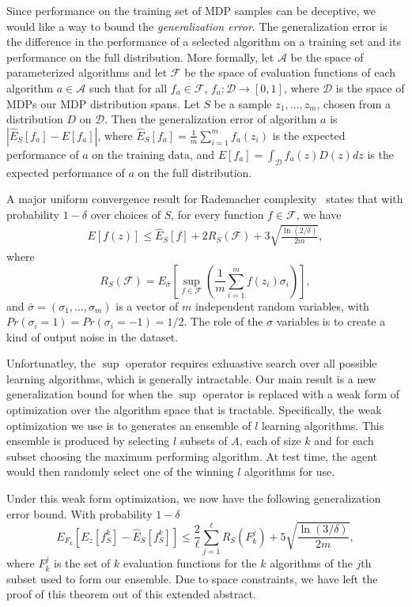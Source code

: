 Since performance on the training set of MDP samples can be deceptive, we would like a way to bound the {\em generalization error}. The generalization error is the difference in the performance of a selected algorithm on a training set and its performance on the full distribution. More formally, let $\mathcal{A}$ be the space of parameterized algorithms and let $\mathcal{F}$ be the space of evaluation functions of each algorithm $a \in \mathcal{A}$ such that for all $f_a \in \mathcal{F}$, $f_a : \mathcal{D} \rightarrow [0,1]$, where $\mathcal{D}$ is the space of MDPs our MDP distribution spans. Let $S$ be a sample $z_1,\dots, z_m$, chosen from a distribution $D$ on $\mathcal{D}$. Then the generalization error of algorithm $a$ is $| \hat{E}_S[f_a] - E[f_a] |$, where $\hat{E}_S[f_a]= \frac{1}{m}\sum_{i=1}^m f_a(z_i)$ is the expected performance of $a$ on the training data, and $E[f_a]= \int_\mathcal{D} f_a(z) D(z) dz$ is the expected performance of $a$ on the full distribution.

A major uniform convergence result for Rademacher complexity~\cite{mohri2012foundations} states that with probability $1-\delta$ over choices of $S$,
for every function $f\in \mathcal{F}$, we have
\begin{eqnarray}
E[f(z)] \le \hat{E}_S[f] + 2 R_S(\mathcal{F}) + 3\sqrt{\frac{\ln(2/\delta)}{2m}},
\end{eqnarray}
where
$$R_S (\mathcal{F}) = E_{\bar{\sigma}} [\sup_{f \in \mathcal{F}} (\frac{1}{m} \sum_{i=1}^m f(z_i) \sigma_i )],$$
and $\bar{\sigma}=(\sigma_1,\dots, \sigma_m)$ is a vector of $m$ independent random variables, with $Pr(\sigma_i =1)=Pr(\sigma_i = -1)=1/2$. The role of the $\sigma$ variables is to create a kind of output noise in the dataset.

Unfortunatley, the $\sup$ operator requires exhuastive search over all possible learning algorithms, which is generally intractable. Our main result is a new generalization bound for when the $\sup$ operator is replaced with a weak form of optimization over the algorithm space that is tractable. Specifically, the weak optimization we use is to generates an ensemble of $l$ learning algorithms. This ensemble is produced by selecting $l$ subsets of $A$, each of size $k$ and for each subset choosing the maximum performing algorithm. At test time, the agent would then randomly select one of the winning $l$ algorithms for use.

Under this weak form optimization, we now have the following generalization error bound.
With probability $1-\delta$
$$E_{{F_k}}[ E_z[f^k_S] - \hat{E}_S[f^k_S] ] \leq \frac{2}{\ell} \sum_{j=1}^\ell R_S(F^j_k)+ 5\sqrt{\frac{\ln (3/\delta)}{2m}},$$
where $F_k^j$ is the set of $k$ evaluation functions for the $k$ algorithms of the $j$th subset used to form our ensemble. Due to space constraints, we have left the proof of this theorem out of this extended abstract.

